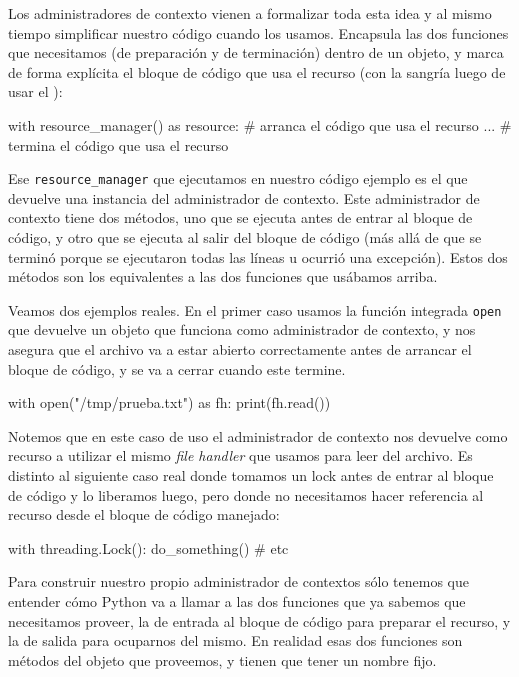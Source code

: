 Los administradores de contexto vienen a formalizar toda esta idea y al mismo tiempo simplificar nuestro código cuando los usamos. Encapsula las dos funciones que necesitamos (de preparación y de terminación) dentro de un objeto, y marca de forma explícita el bloque de código que usa el recurso (con la sangría luego de usar el ):

\begin{py}
with resource_manager() as resource:
    # arranca el código que usa el recurso
    ...
    # termina el código que usa el recurso
\end{py}

Ese \texttt{resource\_manager} que ejecutamos en nuestro código ejemplo es el que devuelve una instancia del administrador de contexto. Este administrador de contexto tiene dos métodos, uno que se ejecuta antes de entrar al bloque de código, y otro que se ejecuta al salir del bloque de código (más allá de que se terminó porque se ejecutaron todas las líneas u ocurrió una excepción). Estos dos métodos son los equivalentes a las dos funciones que usábamos arriba.

Veamos dos ejemplos reales. En el primer caso usamos la función integrada \texttt{open} que devuelve un objeto que funciona como administrador de contexto, y nos asegura que el archivo va a estar abierto correctamente antes de arrancar el bloque de código, y se va a cerrar cuando este termine. 

\begin{py}
with open("/tmp/prueba.txt") as fh:
    print(fh.read())
\end{py}

Notemos que en este caso de uso el administrador de contexto nos devuelve como recurso a utilizar el mismo \textit{file handler} que usamos para leer del archivo. Es distinto al siguiente caso real donde tomamos un lock antes de entrar al bloque de código y lo liberamos luego, pero donde no necesitamos hacer referencia al recurso desde el bloque de código manejado:

\begin{py}
with threading.Lock():
    do_something()
    # etc
\end{py}

Para construir nuestro propio administrador de contextos sólo tenemos que entender cómo Python va a llamar a las dos funciones que ya sabemos que necesitamos proveer, la de entrada al bloque de código para preparar el recurso, y la de salida para ocuparnos del mismo. En realidad esas dos funciones son métodos del objeto que proveemos, y tienen que tener un nombre fijo.

